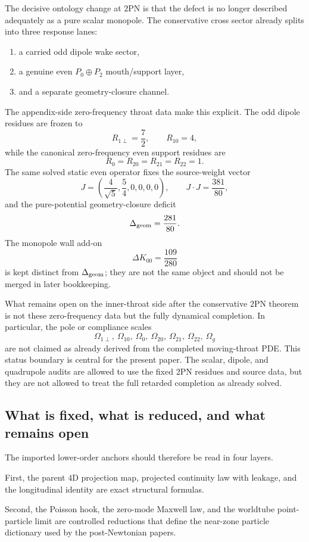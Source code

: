 \documentclass[11pt]{article}
\begin{document}
The decisive ontology change at $2$PN is that the defect is no longer described adequately
as a pure scalar monopole.  The conservative cross sector already splits into three
response lanes:
\begin{enumerate}
  \item a carried odd dipole wake sector,
  \item a genuine even $P_0\oplus P_2$ mouth/support layer,
  \item and a separate geometry-closure channel.
\end{enumerate}
The appendix-side zero-frequency throat data make this explicit.  The odd dipole residues
are frozen to
\[
R_{1\perp}=\frac72,
\qquad
R_{10}=4,
\]
while the canonical zero-frequency even support residues are
\[
R_0=R_{20}=R_{21}=R_{22}=1.
\]
The same solved static even operator fixes the source-weight vector
\[
J=\left(\frac{4}{\sqrt5},\frac54,0,0,0,0\right),
\qquad
J\cdot J=\frac{381}{80},
\]
and the pure-potential geometry-closure deficit
\[
\Delta_{\rm geom}=\frac{281}{80}.
\]
The monopole wall add-on
\[
\Delta K_{00}=\frac{109}{280}
\]
is kept distinct from $\Delta_{\rm geom}$; they are not the same object and should not be
merged in later bookkeeping.

What remains open on the inner-throat side after the conservative $2$PN theorem is not
these zero-frequency data but the fully dynamical completion.  In particular, the pole or
compliance scales
\[
\Omega_{1\perp},\ \Omega_{10},\ \Omega_0,
\ \Omega_{20},\ \Omega_{21},\ \Omega_{22},\ \Omega_g
\]
are not claimed as already derived from the completed moving-throat PDE.  This status
boundary is central for the present paper.  The scalar, dipole, and quadrupole audits are
allowed to use the fixed $2$PN residues and source data, but they are not allowed to treat
the full retarded completion as already solved.

\subsection{What is fixed, what is reduced, and what remains open}
\label{app:imported-lower-order-anchors-status}

The imported lower-order anchors should therefore be read in four layers.

First, the parent $4$D projection map, projected continuity law with leakage, and the
longitudinal identity are exact structural formulas.

Second, the Poisson hook, the zero-mode Maxwell law, and the worldtube point-particle
limit are controlled reductions that define the near-zone particle dictionary used by the
post-Newtonian papers.
\end{document}
